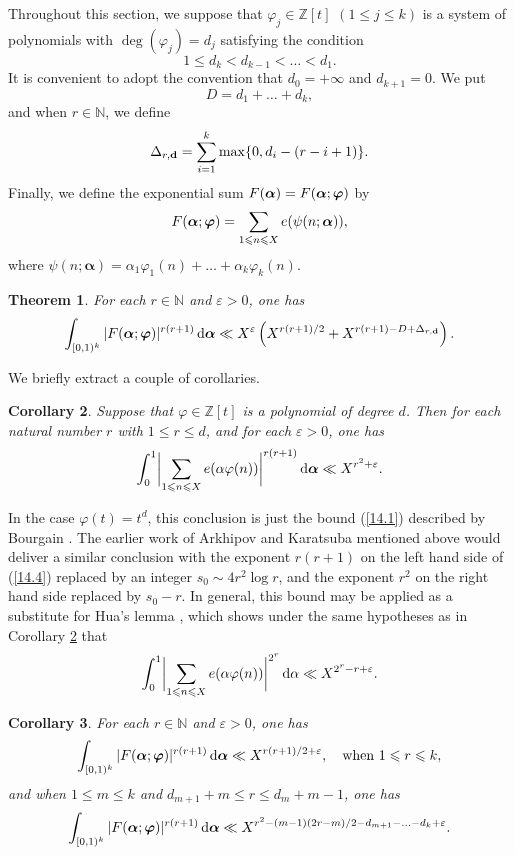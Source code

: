 \documentclass[12pt,reqno]{amsart}
\newtheorem{theorem}{Theorem}[section]
\newtheorem{corollary}[theorem]{Corollary}
\theoremstyle{definition}
\theoremstyle{remark}
\numberwithin{equation}{section}
\def\bfd{{\mathbf d}} \def\bfe{{\mathbf e}} \def\bff{{\mathbf f}}
\def\dbN{{\mathbb N}} \def\dbO{{\mathbb O}} \def\dbP{{\mathbb P}}
\def\dbZ{{\mathbb Z}}\def\dbQ{{\mathbb Q}}
\def\alp{{\alpha}} \def\bfalp{{\boldsymbol \alpha}}
\def\eps{\varepsilon}
\def\le{\leqslant} \def\ge{\geqslant} \def\pleq{\preccurlyeq} \def\ple{\prec}
\def\d{{\,{\rm d}}}
\begin{document}
Throughout this section, we suppose that $\varphi_j\in \dbZ[t]$ $(1\le j\le k)$ 
is a system of polynomials with $\deg(\varphi_j)=d_j$ satisfying the condition
\begin{equation}\label{14.2}
1\le d_k<d_{k-1}<\ldots <d_1.
\end{equation}
It is convenient to adopt the convention that $d_0=+\infty$ and $d_{k+1}=0$. We put
$$D=d_1+\ldots +d_k,$$
and when $r\in \dbN$, we define
\begin{equation}\label{14.3}
\Del_{r,\bfd}=\sum_{i=1}^k\max \{ 0,d_i-(r-i+1)\}.
\end{equation}
Finally, we define the exponential sum $F(\bfalp)=F(\bfalp;\bfvarphi)$ by
$$F(\bfalp;\bfvarphi)=\sum_{1\le n\le X}e(\psi(n;\bfalp)),$$
where $\psi(n;\bfalp)=\alp_1\varphi_1(n)+\ldots +\alp_k\varphi_k(n)$.

\begin{theorem}\label{theorem14.1} For each $r\in \dbN$ and $\eps>0$, one has
$$\int_{[0,1)^k}|F(\bfalp;\bfvarphi)|^{r(r+1)}\d\bfalp \ll X^\eps 
\left( X^{r(r+1)/2}+X^{r(r+1)-D+\Del_{r,\bfd}}\right).$$
\end{theorem}

We briefly extract a couple of corollaries.

\begin{corollary}\label{corollary14.2} Suppose that $\varphi\in \dbZ[t]$ is a polynomial of 
degree $d$. Then for each natural number $r$ with $1\le r\le d$, and for each $\eps>0$, 
one has
\begin{equation}\label{14.4}
\int_0^1 \biggl| \sum_{1\le n\le X}e(\alp \varphi(n))\biggr|^{r(r+1)}\d\bfalp 
\ll X^{r^2+\eps}.
\end{equation}
\end{corollary}

In the case $\varphi(t)=t^d$, this conclusion is just the bound (\ref{14.1}) described by 
Bourgain \cite[Theorem 10]{Bou2017}. The earlier work of Arkhipov and Karatsuba 
mentioned above would deliver a similar conclusion with the exponent $r(r+1)$ on the left 
hand side of (\ref{14.4}) replaced by an integer $s_0\sim 4r^2\log r$, and the exponent 
$r^2$ on the right hand side replaced by $s_0-r$. In general, this bound may be applied as 
a substitute for Hua's lemma \cite{Hua1938b}, which shows under the same hypotheses as 
in Corollary \ref{corollary14.2} that
$$\int_0^1\biggl| \sum_{1\le n\le X}e(\alp \varphi(n))\biggr|^{2^r}\d\alp \ll 
X^{2^r-r+\eps}.$$

\begin{corollary}\label{corollary14.3} For each $r\in \dbN$ and $\eps>0$, one has
$$\int_{[0,1)^k}|F(\bfalp;\bfvarphi)|^{r(r+1)}\d\bfalp \ll X^{r(r+1)/2+\eps},\quad 
\text{when $1\le r\le k$},$$
and when $1\le m\le k$ and $d_{m+1}+m\le r\le d_m+m-1$, one has
$$\int_{[0,1)^k}|F(\bfalp;\bfvarphi)|^{r(r+1)}\d\bfalp \ll 
X^{r^2-(m-1)(2r-m)/2-d_{m+1}-\ldots -d_k+\eps}.$$
\end{corollary}
\end{document}
